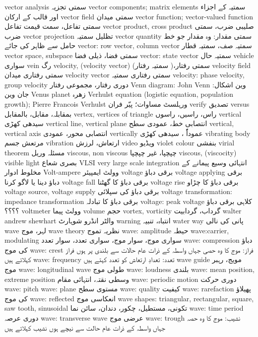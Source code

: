 vector analysis	سمتی تجزیہ
vector components; matrix elements	سمتیہ کے اجزاء اور قالب کے ارکان
vector field	سمتی میدان
vector function; vector-valued function	سمتی تفاعل، سمت قیمت تفاعل
vector product, cross product	صلیبی ضرب، سمتی ضرب
vector projection	تظلیل سمتیہ
vector quantity	سمتی مقدار: وہ مقدار جو خط حامل سے ظاہر کی جائے
vector: row vector, column vector	سمتیہ صف، سمتیہ قطار
vector space, subspace	سمتی فضا، ذیلی فضا
vector: state vector	سمتیہ حال
vehicle	سواری
vein	رگ
velocity, (velocity vector)	سمتی رفتار،( سمتیہ رفتار)
velocity field	سمتی رفتاری میدان
velocity vector	سمتی رفتاری سمتیہ
velocity: phase velocity, group velocity	دوری رفتار، مجموعی رفتار
Venn diagram: John Venn	وین اشکال: جان وین
Venus planet	زھرہ
Verhulst equation (logistic equation, population growth); Pierre Francois Verhulst	ورہلسٹ مساوات؛ پیّر فران
verify	تصدیق
versus	بمقابلہ، مقابل، بالمقابل
vertex, vertices of triangle	راس، راسیں، راسوں
vertical	سیدھی کھڑی
vertical line, vertical plane	انتصابی خط، عمودی سطح
vertical, vertical axis	انتصابی محور، عمودی
vertically	عموداًً ، سیدھی کھڑی
vibrating body	مرتعش جسم
vibration	ارتعاش، لرزش
video	ویڈیو
violet colour	بنفشی
virial theorem	مسئلہ وریل
viscous, non viscous	چپچپا، غیر چپچپا
viscous, (viscocity)	
visible light	بصری شعاع
VLSI very large scale integration	انتہائی وسیع  پیمانے   کے مخلوط ادوار
Volt-ampere	وولٹ ایمپیئر
voltage	برقی دباؤ
voltage applying	برقی دباؤ دینا یا لاگو کرنا
voltage fall	برقی دباؤ کا گھٹنا
voltage rise	برقی دباؤ کا چڑاو
voltage source, voltage supply	برقی دباؤ کی سپلائی
voltage transformation: impedance transformation	برقی دباؤ کا تبادلہ
voltage: peak voltage	کلاہی برقی دباؤ ؟؟؟؟
voltmeter	وولٹ پیما
volume	حجم
vortex, vorticity	گرداب، گردابیت
walter andrew shewhart	والٹر انڈرو شوہارٹ
warning	انتباہ، تنبیہ
 water way	پانی کی نالی
wave	لہر، موج
wave theory	نظریہ تموج
wave: amplitude	حیطہ
wave:carrier, modulating	سواری موج، سوار موج، سواری تعدد، سوار تعدد
wave: compression	دباؤ کی موج
wave: crest	فراز: موج کا وہ حصی جہاں واسطہ کے ذرات عام حالات سے بلندی پر ہوں فراز کہلاتے ہیں
wave: frequency	تعدد: تعدادِ ارتعاش کو تعدد کہتے ہیں
wave guide	مویج، رہبر موج
wave: longitudinal wave	طولی موج
wave: loudness	بلندی
wave: mean position, extreme position	وسطی نقتہ، انتہائی مقام
wave: periodic motion	دوری حرکت
wave: pitch	
wave: plane	مستوی سطح
wave: quality	کیفیت
wave: rarefaction	پھیلاؤ کی موج
wave: reflected	انعکاسی موج
wave shapes: triangular, rectangular, square, saw tooth, sinusoidal	تکونی، مستطیل، چکور، دندان، سائن نما
wave: time period	دوری عرصہ 
wave: transverse wave	عرضی موج
wave: trough	نشیب: موج کا وہ حصہ جہاں واسطہ کے ذرات عام حالت سے نیچے ہوں نشیب کہلاتے ہیں
